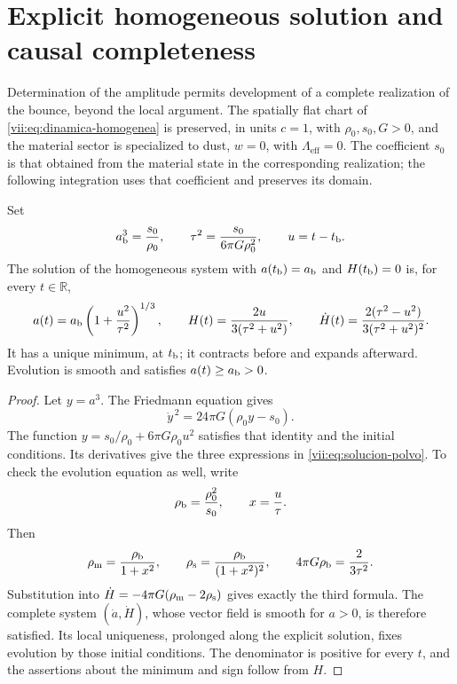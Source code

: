 \section{Explicit homogeneous solution and causal completeness}
\label{vii:sec:solucion-homogenea}
Determination of the amplitude permits development of a complete
realization of the bounce, beyond the local argument. The spatially
flat chart of \eqref{vii:eq:dinamica-homogenea} is preserved, in units
\(c=1\), with \(\rho_0,s_0,G>0\), and the material sector is specialized
to dust, \(w=0\), with \(\Lambda_{\mathrm{eff}}=0\).
The coefficient \(s_0\) is that obtained from the material
state in the corresponding realization; the following integration
uses that coefficient and preserves its domain.

\begin{theorem}
\label{vii:thm:rebote-polvo}
Set
\[
 a_{\rm b}^3=\frac{s_0}{\rho_0},\qquad
 \tau^2=\frac{s_0}{6\pi G\rho_0^2},\qquad u=t-t_{\rm b}.
\]
The solution of the homogeneous system with
\(a(t_{\rm b})=a_{\rm b}\) and \(H(t_{\rm b})=0\) is, for every
\(t\in\mathbb R\),
\begin{equation}
 a(t)=a_{\rm b}\left(1+\frac{u^2}{\tau^2}\right)^{1/3},
 \qquad H(t)=\frac{2u}{3(\tau^2+u^2)},\qquad
 \dot H(t)=\frac{2(\tau^2-u^2)}{3(\tau^2+u^2)^2}.
 \label{vii:eq:solucion-polvo}
\end{equation}
It has a unique minimum, at \(t_{\rm b}\); it contracts before and
expands afterward. Evolution is smooth and satisfies
\(a(t)\geq a_{\rm b}>0\).
\end{theorem}
\begin{proof}
Let \(y=a^3\). The Friedmann equation gives
\[
 \dot y^{\,2}=24\pi G(\rho_0y-s_0).
\]
The function \(y=s_0/\rho_0+6\pi G\rho_0u^2\) satisfies that
identity and the initial conditions. Its derivatives give the
three expressions in \eqref{vii:eq:solucion-polvo}. To check
the evolution equation as well, write
\[
 \rho_{\rm b}=\frac{\rho_0^2}{s_0},\qquad
 x=\frac{u}{\tau}.
\]
Then
\[
 \rho_{\rm m}=\frac{\rho_{\rm b}}{1+x^2},\qquad
 \rho_{\rm s}=\frac{\rho_{\rm b}}{(1+x^2)^2},\qquad
 4\pi G\rho_{\rm b}=\frac{2}{3\tau^2}.
\]
Substitution into \(\dot H=-4\pi G(\rho_{\rm m}-2\rho_{\rm s})\)
gives exactly the third formula. The complete system
\((\dot a,\dot H)\), whose vector field is smooth for \(a>0\),
is therefore satisfied. Its local uniqueness, prolonged along the explicit
solution, fixes evolution by those initial conditions.
The denominator is positive for every \(t\), and the assertions
about the minimum and sign follow from \(H\).
\end{proof}

